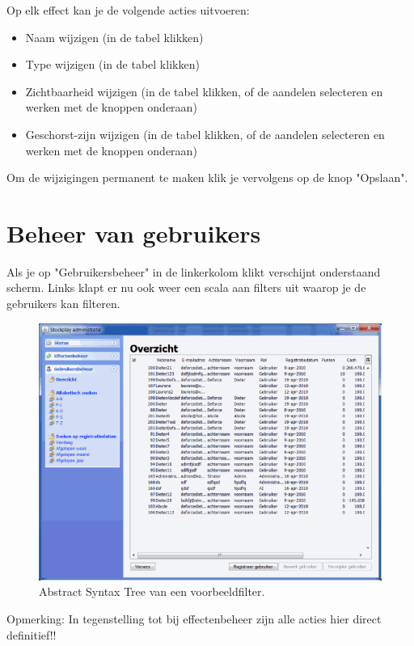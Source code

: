 Op elk effect kan je de volgende acties uitvoeren:

\begin{itemize}
\item{Naam wijzigen (in de tabel klikken)}
\item{Type wijzigen (in de tabel klikken)}
\item{Zichtbaarheid wijzigen (in de tabel klikken, of de aandelen selecteren en werken met de knoppen onderaan)}
\item{Geschorst-zijn wijzigen (in de tabel klikken, of de aandelen selecteren en werken met de knoppen onderaan)}
\end{itemize}

Om de wijzigingen permanent te maken klik je vervolgens op de knop "Opslaan".

\section{Beheer van gebruikers}

Als je op "Gebruikersbeheer" in de linkerkolom klikt verschijnt onderstaand scherm.
Links klapt er nu ook weer een scala aan filters uit waarop je de gebruikers kan filteren.

\begin{figure}[h!]
	\centering
		\includegraphics[width=\textwidth]{images/handleiding/handleiding5.gif}
	\caption{Abstract Syntax Tree van een voorbeeldfilter.}
\end{figure}

Opmerking: In tegenstelling tot bij effectenbeheer zijn alle acties hier direct definitief!!

